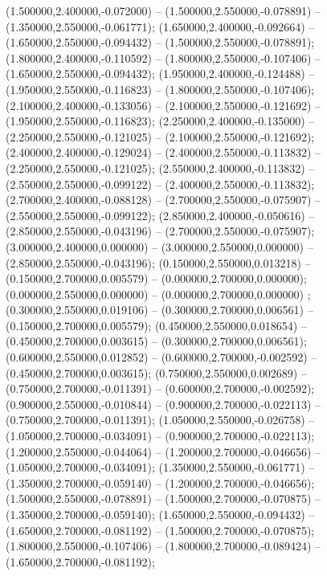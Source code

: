  (1.500000,2.400000,-0.072000) -- (1.500000,2.550000,-0.078891) -- (1.350000,2.550000,-0.061771);
 (1.650000,2.400000,-0.092664) -- (1.650000,2.550000,-0.094432) -- (1.500000,2.550000,-0.078891);
 (1.800000,2.400000,-0.110592) -- (1.800000,2.550000,-0.107406) -- (1.650000,2.550000,-0.094432);
 (1.950000,2.400000,-0.124488) -- (1.950000,2.550000,-0.116823) -- (1.800000,2.550000,-0.107406);
 (2.100000,2.400000,-0.133056) -- (2.100000,2.550000,-0.121692) -- (1.950000,2.550000,-0.116823);
 (2.250000,2.400000,-0.135000) -- (2.250000,2.550000,-0.121025) -- (2.100000,2.550000,-0.121692);
 (2.400000,2.400000,-0.129024) -- (2.400000,2.550000,-0.113832) -- (2.250000,2.550000,-0.121025);
 (2.550000,2.400000,-0.113832) -- (2.550000,2.550000,-0.099122) -- (2.400000,2.550000,-0.113832);
 (2.700000,2.400000,-0.088128) -- (2.700000,2.550000,-0.075907) -- (2.550000,2.550000,-0.099122);
 (2.850000,2.400000,-0.050616) -- (2.850000,2.550000,-0.043196) -- (2.700000,2.550000,-0.075907);
 (3.000000,2.400000,0.000000) -- (3.000000,2.550000,0.000000) -- (2.850000,2.550000,-0.043196);
 (0.150000,2.550000,0.013218) -- (0.150000,2.700000,0.005579) -- (0.000000,2.700000,0.000000);
 (0.000000,2.550000,0.000000) -- (0.000000,2.700000,0.000000) ;
 (0.300000,2.550000,0.019106) -- (0.300000,2.700000,0.006561) -- (0.150000,2.700000,0.005579);
 (0.450000,2.550000,0.018654) -- (0.450000,2.700000,0.003615) -- (0.300000,2.700000,0.006561);
 (0.600000,2.550000,0.012852) -- (0.600000,2.700000,-0.002592) -- (0.450000,2.700000,0.003615);
 (0.750000,2.550000,0.002689) -- (0.750000,2.700000,-0.011391) -- (0.600000,2.700000,-0.002592);
 (0.900000,2.550000,-0.010844) -- (0.900000,2.700000,-0.022113) -- (0.750000,2.700000,-0.011391);
 (1.050000,2.550000,-0.026758) -- (1.050000,2.700000,-0.034091) -- (0.900000,2.700000,-0.022113);
 (1.200000,2.550000,-0.044064) -- (1.200000,2.700000,-0.046656) -- (1.050000,2.700000,-0.034091);
 (1.350000,2.550000,-0.061771) -- (1.350000,2.700000,-0.059140) -- (1.200000,2.700000,-0.046656);
 (1.500000,2.550000,-0.078891) -- (1.500000,2.700000,-0.070875) -- (1.350000,2.700000,-0.059140);
 (1.650000,2.550000,-0.094432) -- (1.650000,2.700000,-0.081192) -- (1.500000,2.700000,-0.070875);
 (1.800000,2.550000,-0.107406) -- (1.800000,2.700000,-0.089424) -- (1.650000,2.700000,-0.081192);
